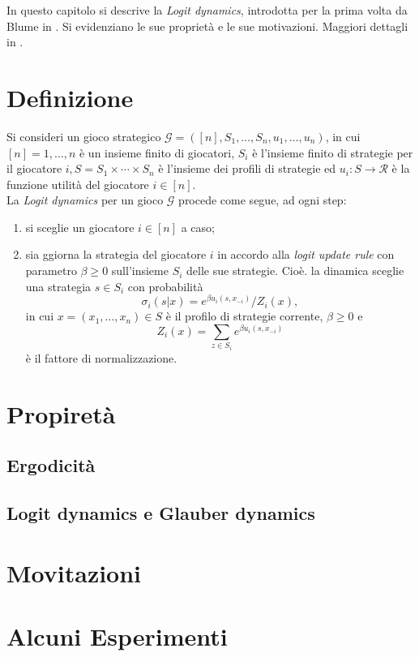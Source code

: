 In questo capitolo si descrive la \textit{Logit dynamics}, introdotta per la prima volta da Blume in \cite{blume1993statistical}. Si evidenziano le sue proprietà e le sue motivazioni. Maggiori dettagli in \cite{ferraioli2012logit}.
\section{Definizione}
Si consideri un gioco strategico $\mathcal{G} = ([n], S_1, \dots, S_n, u_1, \dots, u_n)$, in cui $[n] = {1, \dots, n}$ è un insieme finito di giocatori, $S_i$ è l'insieme finito di strategie per il giocatore $i, S = S_1 \times \cdots \times S_n$ è l'insieme dei profili di strategie ed $u_i: S \rightarrow \mathcal{R}$ è la funzione utilità del giocatore $i \in [n]$.\\
La \textit{Logit dynamics} per un gioco $\mathcal{G}$ procede come segue, ad ogni step:
\begin{enumerate}
	\item si sceglie un giocatore $i \in [n]$ a caso;
	\item sia ggiorna la strategia del giocatore $i$ in accordo alla \textit{logit update rule} con parametro $\beta \geq 0$ sull'insieme $S_i$ delle sue strategie. Cioè. la dinamica sceglie una strategia $s \in S_i$ con probabilità
	\begin{equation}
		\sigma_i (s|x) = e^{\beta u_i (s, x_{-i})}/Z_i(x),
	\end{equation}
	in cui $x = (x_1, \dots, x_n) \in S$ è il profilo di strategie corrente, $\beta \geq 0$ e
	\begin{equation}
		Z_i(x) = \sum_{z\in S_i}{e^{\beta u_i (s, x_{-i})}}
	\end{equation}
	è il fattore di normalizzazione.
\end{enumerate}


\section{Propiretà}
\subsection{Ergodicità}
\subsection{Logit dynamics e Glauber dynamics}

\section{Movitazioni}

\section{Alcuni Esperimenti}